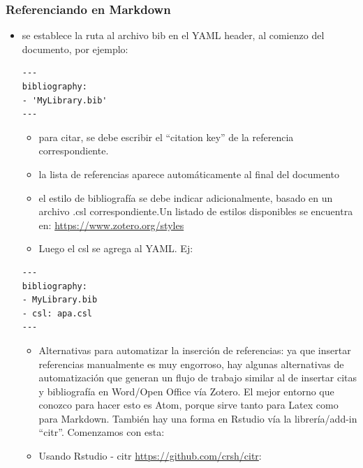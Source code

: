 \documentclass[
  11pt,
]{book}
\providecommand{\tightlist}{%
  \setlength{\itemsep}{0pt}\setlength{\parskip}{0pt}}
\begin{document}
\hypertarget{referenciando-en-markdown}{%
\subsubsection{Referenciando en Markdown}\label{referenciando-en-markdown}}

\begin{itemize}
\item
  se establece la ruta al archivo bib en el YAML header, al comienzo del documento, por ejemplo:

\begin{verbatim}
---
bibliography:
- 'MyLibrary.bib'
---
\end{verbatim}

  \begin{itemize}
  \tightlist
  \item
    para citar, se debe escribir el ``citation key'' de la referencia correspondiente.
  \item
    la lista de referencias aparece automáticamente al final del documento
  \item
    el estilo de bibliografía se debe indicar adicionalmente, basado en un archivo .csl correspondiente.Un listado de estilos disponibles se encuentra en: \url{https://www.zotero.org/styles}
  \item
    Luego el csl se agrega al YAML. Ej:
  \end{itemize}

\begin{verbatim}
---
bibliography:
- MyLibrary.bib
- csl: apa.csl
---
\end{verbatim}

  \begin{itemize}
  \item
    Alternativas para automatizar la inserción de referencias: ya que insertar referencias manualmente es muy engorroso, hay algunas alternativas de automatización que generan un flujo de trabajo similar al de insertar citas y bibliografía en Word/Open Office vía Zotero. El mejor entorno que conozco para hacer esto es Atom, porque sirve tanto para Latex como para Markdown. También hay una forma en Rstudio vía la librería/add-in ``citr''. Comenzamos con esta:
  \item
    Usando Rstudio - citr \url{https://github.com/crsh/citr}:


\end{itemize}
\end{itemize}
\end{document}

